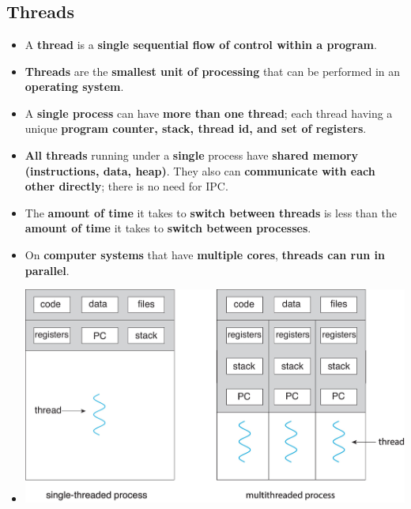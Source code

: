 \documentclass{article}
\begin{document}
\section*{}

\subsection*{Threads}
\begin{itemize}
    \item A \textbf{thread} is a \textbf{single sequential flow of control within a program}.
    \item \textbf{Threads} are the \textbf{smallest unit of processing} that can be performed in an \textbf{operating system}.
    \item A \textbf{single process} can have \textbf{more than one thread}; each thread having a unique \textbf{program counter, stack, thread id, and set of registers}.
    \item \textbf{All threads} running under a \textbf{single} process have \textbf{shared memory (instructions, data, heap)}. They also can \textbf{communicate with each other directly}; there is no need for IPC.
    \item The \textbf{amount of time} it takes to \textbf{switch between threads} is less than the \textbf{amount of time} it takes to \textbf{switch between processes}.
    \item On \textbf{computer systems} that have \textbf{multiple cores}, \textbf{threads can run in parallel}.
    \item[] \begin{center}
                \includegraphics*[width=\textwidth-25pt]{images/Threads.jpg}
            \end{center} 
\end{itemize}
\end{document}
